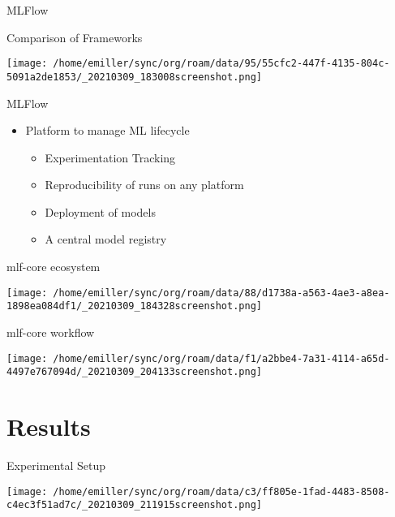 \documentclass[bigger]{beamer}
\begin{document}
\begin{frame}[label={sec:org5dcff0e}]{MLFlow}
\begin{block}{Comparison of Frameworks}
\begin{center}
\texttt{[image: /home/emiller/sync/org/roam/data/95/55cfc2-447f-4135-804c-5091a2de1853/\_20210309\_183008screenshot.png]}
\end{center}
\end{block}
\end{frame}


\begin{frame}[label={sec:org7d5aed3}]{MLFlow}
\begin{itemize}
\item Platform to manage ML lifecycle
\begin{itemize}
\item Experimentation Tracking
\item Reproducibility of runs on any platform
\item Deployment of models
\item A central model registry
\end{itemize}
\end{itemize}
\end{frame}

\begin{frame}[label={sec:org6f61037}]{mlf-core ecosystem}
\begin{center}
\texttt{[image: /home/emiller/sync/org/roam/data/88/d1738a-a563-4ae3-a8ea-1898ea084df1/\_20210309\_184328screenshot.png]}
\end{center}
\end{frame}

\begin{frame}[label={sec:orgb4f7928}]{mlf-core workflow}
\begin{center}
\texttt{[image: /home/emiller/sync/org/roam/data/f1/a2bbe4-7a31-4114-a65d-4497e767094d/\_20210309\_204133screenshot.png]}
\end{center}
\end{frame}


\section{Results}
\label{sec:org68e0488}

\begin{frame}[label={sec:org7878d61}]{Experimental Setup}
\begin{center}
\texttt{[image: /home/emiller/sync/org/roam/data/c3/ff805e-1fad-4483-8508-c4ec3f51ad7c/\_20210309\_211915screenshot.png]}
\end{center}
\end{frame}
\end{document}
